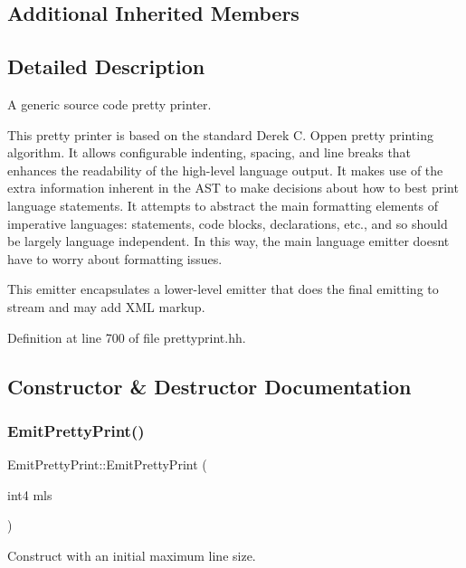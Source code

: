 \subsection*{Additional Inherited Members}


\subsection{Detailed Description}
A generic source code pretty printer. 

This pretty printer is based on the standard Derek C. Oppen pretty printing algorithm. It allows configurable indenting, spacing, and line breaks that enhances the readability of the high-\/level language output. It makes use of the extra information inherent in the A\+ST to make decisions about how to best print language statements. It attempts to abstract the main formatting elements of imperative languages\+: statements, code blocks, declarations, etc., and so should be largely language independent. In this way, the main language emitter doesn\textquotesingle{}t have to worry about formatting issues.

This emitter encapsulates a lower-\/level emitter that does the final emitting to stream and may add X\+ML markup. 

Definition at line 700 of file prettyprint.\+hh.



\subsection{Constructor \& Destructor Documentation}
\mbox{\label{class_emit_pretty_print_a232b39ecc32d329fce5142dd3ef12f9e}} 
\subsubsection{\texorpdfstring{EmitPrettyPrint()}{EmitPrettyPrint()}}
{\footnotesize\ttfamily Emit\+Pretty\+Print\+::\+Emit\+Pretty\+Print (\begin{DoxyParamCaption}\item[{int4}]{mls }\end{DoxyParamCaption})}



Construct with an initial maximum line size. 



